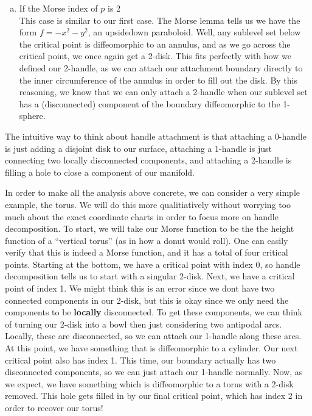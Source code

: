 \documentclass[12pt]{article}
\theoremstyle{definition}
\begin{document}
\begin{enumerate}[(a)]
		\item If the Morse index of $p$ is 2\\
		This case is similar to our first case. The Morse lemma tells us we have the form $f = -x^2-y^2$, an upsidedown paraboloid. Well, any sublevel set below the critical point is diffeomorphic to an annulus, and as we go across the critical point, we once again get a 2-disk. This fits perfectly with how we defined our 2-handle, as we can attach our attachment boundary directly to the inner circumference of the annulus in order to fill out the disk. By this reasoning, we know that we can only attach a 2-handle when our sublevel set has a (disconnected) component of the boundary diffeomorphic to the 1-sphere. 
	\end{enumerate}

	The intuitive way to think about handle attachment is that attaching a 0-handle is just adding a disjoint disk to our surface, attaching a 1-handle is just connecting two locally disconnected components, and attaching a 2-handle is filling a hole to close a component of our manifold. 

	In order to make all the analysis above concrete, we can consider a very simple example, the torus. We will do this more qualitiatively without worrying too much about the exact coordinate charts in order to focus more on handle decomposition. To start, we will take our Morse function to be the the height function of a ``vertical torus'' (as in how a donut would roll). One can easily verify that this is indeed a Morse function, and it has a total of four critical points. Starting at the bottom, we have a critical point with index 0, so handle decomposition tells us to start with a singular 2-disk. Next, we have a critical point of index 1. We might think this is an error since we dont have two connected components in our 2-disk, but this is okay since we only need the components to be \textbf{locally} disconnected. To get these components, we can think of turning our 2-disk into a bowl then just considering two antipodal arcs. Locally, these are disconnected, so we can attach our 1-handle along these arcs. At this point, we have something that is diffeomorphic to a cylinder. Our next critical point also has index 1. This time, our boundary actually has two disconnected components, so we can just attach our 1-handle normally. Now, as we expect, we have something which is diffeomorphic to a torus with a 2-disk removed. This hole gets filled in by our final critical point, which has index 2 in order to recover our torus! 
\end{document}
